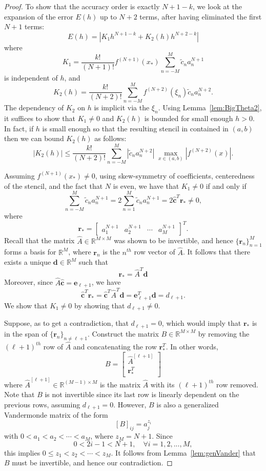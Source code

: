 \documentclass[12pt]{article}
\newcommand{\R}{\mathbb{R}}
\newcommand{\xstar}{x_*}
\newcommand{\rstar}{r_*}
\begin{document}
\begin{proof}
To show that the accuracy order is exactly $N+1-k$, we look at the expansion of the error $E(h)$ up to $N+2$ terms, after having eliminated the first $N+1$ terms:
\begin{equation*}
    E(h) = \left| K_1h^{N+1-k} + K_2(h)h^{N+2-k} \right|
\end{equation*}
where
\[
	K_1 = \frac{k!}{(N+1)!}f^{(N+1)}(\xstar) \sum_{n=-M}^M \tilde c_n a_n^{N+1}
\]
is independent of $h$, and
\[
	K_2(h) = \frac{k!}{(N+2)!} \sum_{n=-M}^{M} f^{(N+2)}(\xi_n)\tilde c_na_n^{N+2}.
\]
The dependency of $K_2$ on $h$ is implicit via the $\xi_n$.
Using Lemma~\ref{lem:BigTheta2}, it suffices to show that $K_1\neq 0$ and $K_2(h)$ is bounded for small enough $h>0$.
In fact, if $h$ is small enough so that the resulting stencil in contained in $(a,b)$ then we can bound $K_2(h)$ as follows:
\[
	|K_2(h)| \le \frac{k!}{(N+2)!}\sum_{n=-M}^M |\tilde c_na_n^{N+2}| \; \max_{x\in(a,b)}\left|f^{(N+2)}(x)\right|.
\]

Assuming $f^{(N+1)}(\xstar)\neq 0$, using skew-symmetry of coefficients, centeredness of the stencil, and the fact that $N$ is even, we have that $K_1\neq 0$ if and only if
\begin{equation}\label{eq:cr}
    \sum_{n=-M}^M \tilde c_n a_n^{N+1} 
    = 2\sum_{n=1}^M \tilde c_n a_n^{N+1}
    = 2 \hat{\mathbf c}^T \mathbf \rstar
    \neq 0,
\end{equation}
where
\[
	\mathbf \rstar =
	\begin{bmatrix}
	a_1^{N+1} &a_2^{N+1} & \cdots &a_M^{N+1}
	\end{bmatrix}^T.
\] 
Recall that the matrix $\hat A\in\R^{M\times M}$ was shown to be invertible, and hence $\{\mathbf r_n\}_{n=1}^M$ forms a basis for $\R^M$, where $\mathbf r_n$ is the $n^{th}$ row vector of $\hat A$.
It follows that there exists a unique $\mathbf d\in\R^M$ such that
\[
	\mathbf \rstar = \hat A^T\mathbf d
\]
Moreover, since $\hat A\hat{\mathbf c}=\mathbf e_{\ell+1}$, we have
\[
	\hat{\mathbf c}^T\mathbf \rstar = \hat{\mathbf c}^T\hat A^T\mathbf d = \mathbf e_{\ell+1}^T\mathbf d= d_{\ell+1}.
\]
We show that $K_1\neq 0$ by showing that $d_{\ell+1}\neq 0$.

Suppose, as to get a contradiction, that $d_{\ell+1}=0$, which would imply that $\mathbf \rstar$ is in the span of $\{\mathbf r_n\}_{n\neq\ell+1}$.
Construct the matrix $B\in\R^{M\times M}$ by removing the $(\ell+1)^{th}$ row of $\hat A$ and concatenating the row $\mathbf \rstar^T$.
In other words, 
\[
	B = \begin{bmatrix}
		\hat A^{[\ell+1]}\\ \mathbf \rstar^T
	\end{bmatrix}
\]
where $\hat A^{[\ell+1]}\in\R^{(M-1)\times M}$ is the matrix $\hat A$ with its $(\ell+1)^{th}$ row removed.
Note that $B$ is not invertible since its last row is linearly dependent on the previous rows, assuming $d_{\ell+1}=0$.
However, $B$ is also a generalized Vandermonde matrix of the form
\[
	[B]_{ij} = a_j^{z_i}
\]
with $0<a_1<a_2<\cdots < a_M$, where $z_M = N+1$. 
Since
\[
	0<2i-1< N+1, \quad \forall i=1,2,...,M,
\]
this implies $0 \le z_1 < z_2 < \cdots < z_M$.
It follows from Lemma~\ref{lem:genVander} that $B$ must be invertible, and hence our contradiction.
\end{proof}
\end{document}
